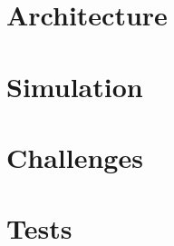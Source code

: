 \documentclass[a4paper,11pt]{article}
\begin{document}
\section{Architecture}


\section{Simulation}



\section{Challenges}

\section{Tests}




\end{document}
